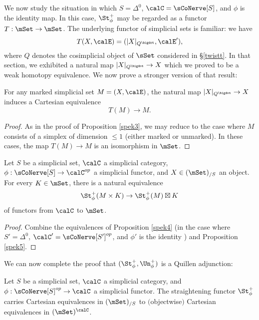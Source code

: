 We now study the situation in which $S = \Delta^0$, $\calC = \sCoNerve[S]$, and $\phi$ is the identity map. In this case, $\St^{+}_{\phi}$ may be regarded as a functor $T: \mSet \rightarrow \mSet$. The underlying functor of simplicial sets
is familiar: we have
$$ T( X, \calE) = ( | X |_{Q^{\bigdot} } , \calE' ),$$ where $Q$ denotes the cosimplicial object of $\sSet$ considered in \S \ref{twistt}. In that section, we exhibited a natural map $|X|_{Q^{\bigdot}} \rightarrow X$ which we proved to be a weak homotopy equivalence. We now prove a stronger version of that result:

\begin{proposition}\label{spek4}
For any marked simplicial set $M = (X, \calE)$, the natural map
$|X|_{Q^{\bigdot}} \rightarrow X$ induces a Cartesian equivalence
$$ T(M) \rightarrow M.$$
\end{proposition} 

\begin{proof}
As in the proof of Proposition \ref{spek3}, we may reduce to the case where $M$ consists of a simplex of dimension $\leq 1$ (either marked or unmarked). In these cases, the map $T(M) \rightarrow M$ is an isomorphism in $\mSet$.
\end{proof}

\begin{corollary}\label{spek5}
Let $S$ be a simplicial set, $\calC$ a simplicial category, $\phi: \sCoNerve[S] \rightarrow \calC^{op}$ a simplicial
functor, and $X \in (\mSet)_{/S}$ an object. For every $K \in \mSet$, there is a natural equivalence 
$$ \St^{+}_{\phi}(M \times K) \rightarrow \St^{+}_{\phi}(M) \boxtimes K$$
of functors from $\calC$ to $\mSet$.
\end{corollary}

\begin{proof}
Combine the equivalences of Proposition \ref{spek4} (in the case where
$S' = \Delta^0$, $\calC' = \sCoNerve[S']^{op}$, and $\phi'$ is the identity ) and Proposition \ref{spek5}.
\end{proof}

We can now complete the proof that $(\St^{+}_{\phi}, \Un^{+}_{\phi})$ is a Quillen adjunction:

\begin{corollary}\label{spek6}
Let $S$ be a simplicial set, $\calC$ a simplicial category, and $\phi: \sCoNerve[S]^{op} \rightarrow \calC$ a simplicial functor. The straightening functor $\St^{+}_{\phi}$ carries Cartesian equivalences in $(\mSet)_{/S}$ to $($objectwise$)$ Cartesian equivalences in $(\mSet)^{\calC}$.
\end{corollary}

